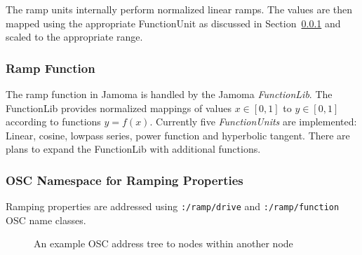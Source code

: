 \documentclass{NIME-alternate}
\begin{document}
The ramp units internally perform normalized linear ramps. The values are then mapped using the appropriate FunctionUnit as discussed in Section~\ref{ssub:the_function_lib} and scaled to the appropriate range. 



\subsubsection{Ramp Function} %
\label{ssub:the_function_lib}

The ramp function in Jamoma is handled by the Jamoma \emph{FunctionLib}.  The FunctionLib provides normalized mappings of values $x \in [0,1]$ to $y \in [0,1]$ according to functions $y = f(x)$. Currently five \emph{FunctionUnits} are implemented: Linear, cosine, lowpass series, power function and hyperbolic tangent. There are plans to expand the FunctionLib with additional functions.



\subsubsection{OSC Namespace for Ramping Properties} %
\label{ssub:osc_namespace_for_ramping_properties}
Ramping properties are addressed using \texttt{:/ramp/drive} and \texttt{:/ramp/function} OSC name classes.

\begin{figure}
\centerline{}
\caption{An example OSC address tree to nodes within another node}
\label{fig:embedded}
\end{figure}
\end{document}
